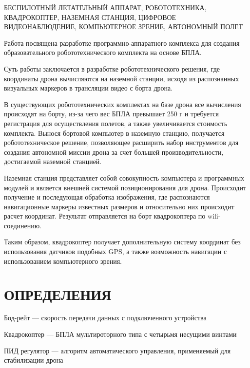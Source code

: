 \documentclass[a4paper,12pt]{article}
\begin{document}
БЕСПИЛОТНЫЙ ЛЕТАТЕЛЬНЫЙ АППАРАТ, РОБОТОТЕХНИКА, КВАДРОКОПТЕР, НАЗЕМНАЯ СТАНЦИЯ, ЦИФРОВОЕ ВИДЕОНАБЛЮДЕНИЕ, КОМПЬЮТЕРНОЕ ЗРЕНИЕ, АВТОНОМНЫЙ ПОЛЕТ

Работа посвящена разработке программно-аппаратного комплекса для создания образовательного робототехнического комплекта на основе БПЛА.

Суть работы заключается в разработке робототехнического решения, где координаты дрона вычисляются на наземной станции, исходя из распознанных визуальных маркеров в трансляции видео с борта дрона.

В существующих робототехнических комплектах на базе дрона все вычисления происходят на борту, из-за чего вес БПЛА превышает 250 г и требуется регистрация для осуществления полетов, а также увеличивается стоимость комплекта. Вынося бортовой компьютер в наземную станцию, получается робототехническое решение, позволяющее расширить набор инструментов для создания автономной миссии дрона за счет большей производительности, достигаемой наземной станцией. 

Наземная станция представляет собой совокупность компьютера и программных модулей и является внешней системой позиционирования для дрона. Происходит получение и последующая обработка изображения, где распознаются навигационные маркеры известных размеров и относительно них происходит расчет координат. Результат отправляется на борт квадрокоптера по wifi-соединению.
 
Таким образом, квадрокоптер получает дополнительную систему координат без использования датчиков подобных GPS, а также возможность навигации с использованием компьютерного зрения.

\pagebreak
\thispagestyle{empty}

\section*{\centering ОПРЕДЕЛЕНИЯ}

\thispagestyle{empty} %

Бод-рейт --- скорость передачи данных с подключенного устройства

Квадрокоптер --- БПЛА мультироторного типа с четырьмя несущими винтами

ПИД регулятор --- алгоритм автоматического управления, применяемый для стабилизации дрона
\end{document}
